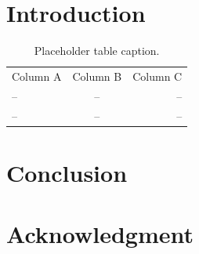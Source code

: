 \documentclass[preprint,12pt,authoryear]{elsarticle}
\begin{document}
\section{Introduction}
\label{sec:intro}

\begin{table}[H]
\centering
\begin{tabular}{l c r}
  Column A & Column B & Column C \\
  -- & -- & -- \\
  -- & -- & -- \\
\end{tabular}
\caption{Placeholder table caption.}\label{tab:placeholder}
\end{table}

\section{Conclusion}
\label{sec:conclusion}

\section*{Acknowledgment}

\end{document}
